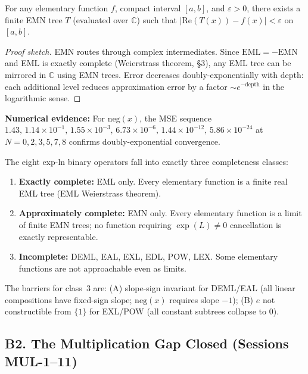 \begin{theorem}
For any elementary function $f$, compact interval $[a,b]$, and $\varepsilon > 0$,
there exists a finite EMN tree $T$ (evaluated over $\mathbb{C}$) such that
$|\mathrm{Re}(T(x)) - f(x)| < \varepsilon$ on $[a,b]$.
\end{theorem}

\begin{proof}[Proof sketch]
EMN routes through complex intermediates. Since $\mathrm{EML} = -\mathrm{EMN}$
and EML is exactly complete (Weierstrass theorem, \S3), any EML tree can be
mirrored in $\mathbb{C}$ using EMN trees. Error decreases doubly-exponentially
with depth: each additional level reduces approximation error by a factor
$\sim e^{-\mathrm{depth}}$ in the logarithmic sense.
\end{proof}

\textbf{Numerical evidence:} For $\mathrm{neg}(x)$, the MSE sequence
$1.43,\, 1.14 \times 10^{-1},\, 1.55 \times 10^{-3},\, 6.73 \times 10^{-6},\,
1.44 \times 10^{-12},\, 5.86 \times 10^{-24}$ at $N = 0,2,3,5,7,8$ confirms
doubly-exponential convergence.

\begin{corollary}
The eight exp-ln binary operators fall into exactly three completeness classes:
\begin{enumerate}
  \item \textbf{Exactly complete:} EML only. Every elementary function is a
    finite real EML tree (EML Weierstrass theorem).
  \item \textbf{Approximately complete:} EMN only. Every elementary function
    is a limit of finite EMN trees; no function requiring $\exp(L) \neq 0$
    cancellation is exactly representable.
  \item \textbf{Incomplete:} DEML, EAL, EXL, EDL, POW, LEX. Some elementary
    functions are not approachable even as limits.
\end{enumerate}
The barriers for class~3 are: (A) slope-sign invariant for DEML/EAL
(all linear compositions have fixed-sign slope; $\mathrm{neg}(x)$ requires
slope $-1$); (B) $e$ not constructible from $\{1\}$ for EXL/POW
(all constant subtrees collapse to $0$).
\end{corollary}

\subsection*{B2. The Multiplication Gap Closed (Sessions MUL-1--11)}

